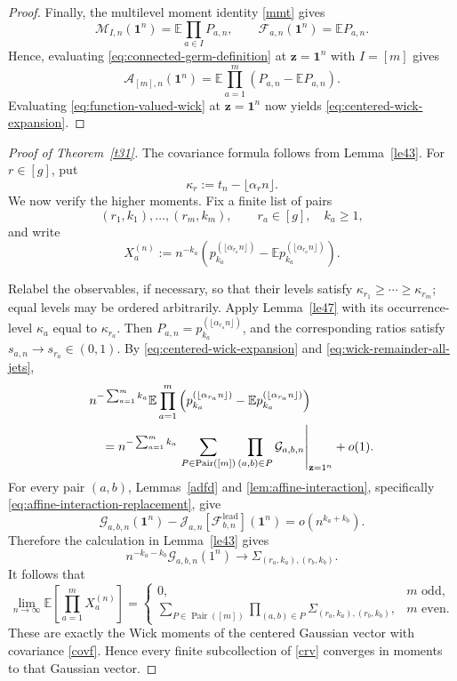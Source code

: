 \documentclass[11pt]{amsart}
\theoremstyle{plain}
\numberwithin{equation}{section}
\numberwithin{theorem}{section}
\numberwithin{figure}{section}
\begin{document}
\begin{proof}
Finally, the multilevel moment identity \eqref{mmt} gives
\[
    \mathcal M_{I,n}(\mathbf1^n)
    =
    \mathbb E\prod_{a\in I}P_{a,n},
    \qquad
    \mathcal F_{a,n}(\mathbf1^n)
    =
    \mathbb E P_{a,n}.
\]
Hence, evaluating \eqref{eq:connected-germ-definition} at
\(\mathbf z=\mathbf1^n\) with \(I=[m]\) gives
\[
    \mathcal A_{[m],n}(\mathbf1^n)
    =
    \mathbb E\prod_{a=1}^{m}
    \left(P_{a,n}-\mathbb E P_{a,n}\right).
\]
Evaluating \eqref{eq:function-valued-wick} at
\(\mathbf z=\mathbf1^n\) now yields
\eqref{eq:centered-wick-expansion}.
\end{proof}
\endgroup

\begin{proof}[Proof of Theorem~\ref{t31}]
The covariance formula follows from Lemma~\ref{le43}. For $r\in[g]$, put
\[
    \kappa_r:=t_n-\lfloor\alpha_r n\rfloor.
\]
We now verify the higher moments. Fix a finite list of pairs
\[
    (r_1,k_1),\ldots,(r_m,k_m),
    \qquad r_a\in[g],\quad k_a\geq1,
\]
and write
\[
    X_a^{(n)}
    :=
    n^{-k_a}\left(
        p_{k_a}^{(\lfloor\alpha_{r_a}n\rfloor)}
        -\mathbb E p_{k_a}^{(\lfloor\alpha_{r_a}n\rfloor)}
    \right).
\]
\begingroup

Relabel the observables, if necessary, so that their levels satisfy
$\kappa_{r_1}\geq\cdots\geq\kappa_{r_m}$; equal levels may be ordered
arbitrarily.  Apply Lemma~\ref{le47} with its occurrence-level
$\kappa_a$ equal to $\kappa_{r_a}$.  Then
$P_{a,n}=p_{k_a}^{(\lfloor\alpha_{r_a}n\rfloor)}$, and the
corresponding ratios satisfy $s_{a,n}\to s_{r_a}\in(0,1)$.  By
\eqref{eq:centered-wick-expansion} and
\eqref{eq:wick-remainder-all-jets},
\begin{align*}
&n^{-\sum_{a=1}^{m}k_a}
\mathbb E\prod_{a=1}^{m}
\left(
    p_{k_a}^{(\lfloor\alpha_{r_a}n\rfloor)}
    -\mathbb E p_{k_a}^{(\lfloor\alpha_{r_a}n\rfloor)}
\right)\notag\\
&\quad=
n^{-\sum_{a=1}^{m}k_a}
\left.
\sum_{P\in\operatorname{Pair}([m])}
\prod_{(a,b)\in P}\mathcal G_{a,b,n}
\right|_{\mathbf z=1^n}
+o(1).
\end{align*}
For every pair $(a,b)$, Lemmas~\ref{adfd} and
\ref{lem:affine-interaction}, specifically
\eqref{eq:affine-interaction-replacement}, give
\[
    \mathcal G_{a,b,n}(\mathbf1^n)
    -
    \mathscr J_{a,n}
    [\mathcal F^{\mathrm{lead}}_{b,n}](\mathbf1^n)
    =o(n^{k_a+k_b}).
\]
Therefore the calculation in Lemma~\ref{le43} gives
\[
    n^{-k_a-k_b}
    \mathcal G_{a,b,n}(1^n)
    \longrightarrow
    \Sigma_{(r_a,k_a),(r_b,k_b)}.
\]
It follows that
\[
    \lim_{n\to\infty}
    \mathbb E\left[\prod_{a=1}^{m}X_a^{(n)}\right]
    =
    \begin{cases}
        0, & m\text{ odd},\\[1mm]
        \displaystyle
        \sum_{P\in\operatorname{Pair}([m])}
        \prod_{(a,b)\in P}
        \Sigma_{(r_a,k_a),(r_b,k_b)},
        & m\text{ even}.
    \end{cases}
\]
These are exactly the Wick moments of the centered Gaussian vector with
covariance \eqref{covf}. Hence every finite subcollection of
\eqref{crv} converges in moments to that Gaussian vector.
\endgroup
\end{proof}
\end{document}
